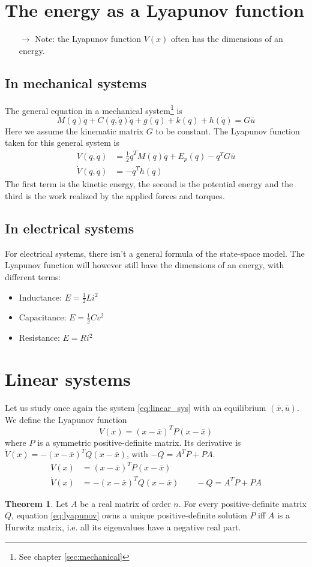 \documentclass[12pt, openany]{report}
\theoremstyle{definition}
\newtheorem{thm}{Theorem}[chapter]
\begin{document}
\section{The energy as a Lyapunov function}
\begin{itemize}
    \item [\(\rightarrow\)] Note: the Lyapunov function \(V(x)\) often has the dimensions of an energy. 
\end{itemize}
\subsection{In mechanical systems}
The general equation in a mechanical system\footnote{See chapter \ref{sec:mechanical}} is 
\begin{equation}
    M(q)\ddot q + C(q,\dot q)\dot q+g(q)+k(q)+h(\dot q)=G\bar u
\end{equation}
Here we assume the kinematic matrix \(G\) to be constant. The Lyapunov function taken for this general system is 
\begin{align}
    V(q,\dot q) &= \frac{1}{2}\dot q^TM(q)\dot q+E_p(q)-q^TG\bar u\\
    \dot V(q,\dot q) &= -\dot q^Th(\dot q)
\end{align}
The first term is the kinetic energy, the second is the potential energy and the third is the work realized by the applied forces and torques.
\subsection{In electrical systems}
For electrical systems, there isn't a general formula of the state-space model. The Lyapunov function will however still have the dimensions of an energy, with different terms:
\begin{itemize}
    \item Inductance: \(E = \frac{1}{2}Li^2\)
    \item Capacitance: \(E = \frac{1}{2}Cv^2\)
    \item Resistance: \(E = Ri^2\)
\end{itemize}
\section{Linear systems}
Let us study once again the system \eqref{eq:linear_sys} with an equilibrium \((\bar x,\bar u)\). We define the Lyapunov function \[V(x) = (x-\bar x)^TP(x-\bar x)\] where \(P\) is a symmetric positive-definite matrix. Its derivative is \(\dot V(x) = -(x-\bar x)^TQ(x-\bar x)\), with \(-Q=A^TP+PA\). 
\begin{align}
    V(x) &= (x-\bar x)^TP(x-\bar x)\\
    \dot V(x) &= -(x-\bar x)^TQ(x-\bar x)\qquad -Q = A^TP+PA \label{eq:lyapunov}
\end{align}
\begin{thm}
    Let \(A\) be a real matrix of order \(n\). For every positive-definite matrix \(Q\), equation \eqref{eq:lyapunov} owns a unique positive-definite solution \(P\) iff \(A\) is a Hurwitz matrix, i.e. all its eigenvalues have a negative real part.
\end{thm}
\end{document}
